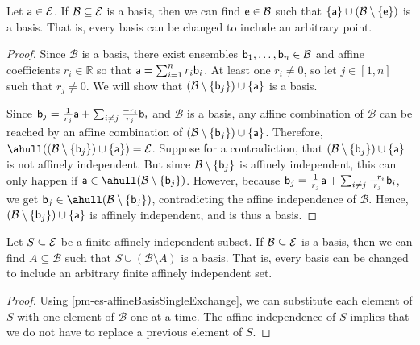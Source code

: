 \begin{mathSection}
\begin{prop}\label{pm-es-affineBasisSingleExchange}
	Let $\ens[a] \in \Ens$. If $\mathcal{B} \subseteq \Ens$ is a basis, then we can find $\ens[e] \in \mathcal{B}$ such that $\{\ens[a]\} \cup \left(\mathcal{B} \setminus \{\ens[e]\}\right)$ is a basis. That is, every basis can be changed to include an arbitrary point.
\end{prop}

\begin{proof}
	Since $\mathcal{B}$ is a basis, there exist ensembles $\ens[b]_1, \ldots, \ens[b]_n \in \mathcal{B}$ and affine coefficients $r_i \in \mathbb{R}$ so that $\ens[a] = \sum_{i=1}^n r_i\ens[b]_i$. At least one $r_i \ne 0$, so let $j \in [1,n]$ such that $r_j \ne 0$. We will show that $\left(\mathcal{B} \setminus \{\ens[b]_j\}\right) \cup \{\ens[a]\}$ is a basis.
	
	Since $\ens[b]_j = \frac{1}{r_j}\ens[a] + \sum_{i \ne j} \frac{-r_i}{r_j}\ens[b]_i$ and $\mathcal{B}$ is a basis, any affine combination of $\mathcal{B}$ can be reached by an affine combination of $\left(\mathcal{B} \setminus \{\ens[b]_j\}\right) \cup \{\ens[a]\}$. Therefore, $\ahull(\left(\mathcal{B} \setminus \{\ens[b]_j\}\right) \cup \{\ens[a]\}) = \Ens$. Suppose for a contradiction, that $\left(\mathcal{B} \setminus \{\ens[b]_j\}\right) \cup \{\ens[a]\}$ is not affinely independent. But since $\mathcal{B} \setminus \{\ens[b]_j\}$ is affinely independent, this can only happen if $\ens[a] \in \ahull(\mathcal{B} \setminus \{\ens[b]_j\})$. However, because $\ens[b]_j = \frac{1}{r_j}\ens[a] + \sum_{i \ne j} \frac{-r_i}{r_j}\ens[b]_i$, we get $\ens[b]_j \in \ahull(\mathcal{B} \setminus \{\ens[b]_j\})$, contradicting the affine independence of $\mathcal{B}$. Hence, $\left(\mathcal{B} \setminus \{\ens[b]_j\}\right) \cup \{\ens[a]\}$ is affinely independent, and is thus a basis.
\end{proof}

\begin{coro}\label{pm-es-affineBasisExchange}
	Let $S \subseteq \Ens$ be a finite affinely independent subset. If $\mathcal{B} \subseteq \Ens$ is a basis, then we can find $A \subseteq \mathcal{B}$ such that $S \cup \left(\mathcal{B} \setminus A\right)$ is a basis. That is, every basis can be changed to include an arbitrary finite affinely independent set.
\end{coro}

\begin{proof}
	Using \ref{pm-es-affineBasisSingleExchange}, we can substitute each element of $S$ with one element of $\mathcal{B}$ one at a time. The affine independence of $S$ implies that we do not have to replace a previous element of $S$.
\end{proof}


\end{mathSection}
